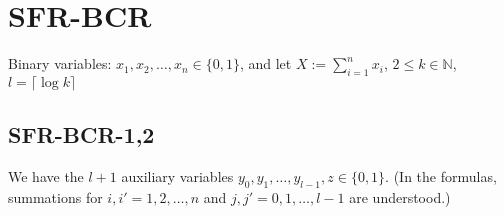 \documentclass[a4paper,11pt]{article}
\newcommand{\ceil}[1]{\lceil #1 \rceil}
\begin{document}

\section{SFR-BCR}

Binary variables: $x_1,x_2,\dots,x_n\in\{0,1\}$,
and let $X:=\sum_{i=1}^n x_i$, $2\leq k\in\mathbb{N}$, $l = \ceil{\log k}$

\subsection{SFR-BCR-1,2}
We have the $l+1$ auxiliary variables $y_0,y_1,\dots,y_{l-1},z\in\{0,1\}$.
(In the formulas, summations for $i,i' = 1,2,\dots,n$ and $j,j' = 0,1,\dots,l-1$ are understood.)\\
\end{document}
